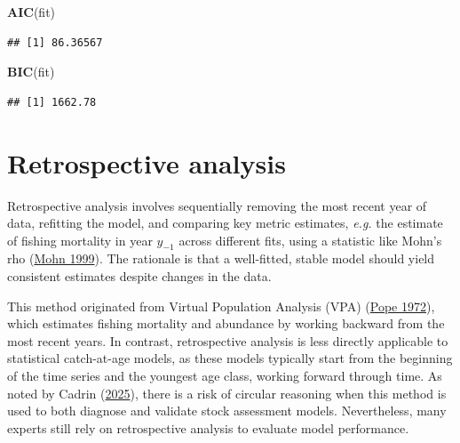 \documentclass[
]{book}
\newenvironment{Shaded}{\begin{snugshade}}{\end{snugshade}}
\newcommand{\FunctionTok}[1]{\textcolor[rgb]{0.13,0.29,0.53}{\textbf{#1}}}
\newcommand{\NormalTok}[1]{#1}
\begin{document}
\begin{Shaded}
\begin{Highlighting}[]
\FunctionTok{AIC}\NormalTok{(fit)}
\end{Highlighting}
\end{Shaded}

\begin{verbatim}
## [1] 86.36567
\end{verbatim}

\begin{Shaded}
\begin{Highlighting}[]
\FunctionTok{BIC}\NormalTok{(fit)}
\end{Highlighting}
\end{Shaded}

\begin{verbatim}
## [1] 1662.78
\end{verbatim}

\hypertarget{retrospective-analysis}{%
\section{Retrospective analysis}\label{retrospective-analysis}}

Retrospective analysis involves sequentially removing the most recent year of data, refitting the model, and comparing key metric estimates, \emph{e.g.} the estimate of fishing mortality in year \(y_{-1}\) across different fits, using a statistic like Mohn's rho (\protect\hyperlink{ref-mohn1999retrospective}{Mohn 1999}). The rationale is that a well-fitted, stable model should yield consistent estimates despite changes in the data.

This method originated from Virtual Population Analysis (VPA) (\protect\hyperlink{ref-pope1972}{Pope 1972}), which estimates fishing mortality and abundance by working backward from the most recent years. In contrast, retrospective analysis is less directly applicable to statistical catch-at-age models, as these models typically start from the beginning of the time series and the youngest age class, working forward through time. As noted by Cadrin (\protect\hyperlink{ref-cadrin2025misinterpreting}{2025}), there is a risk of circular reasoning when this method is used to both diagnose and validate stock assessment models. Nevertheless, many experts still rely on retrospective analysis to evaluate model performance.
\end{document}
